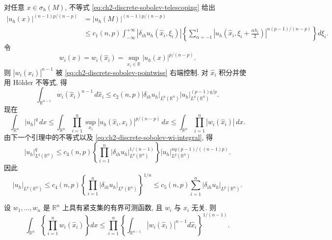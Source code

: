 \begin{Proof}
\hypertarget{chapter-02-page-138}{}
对任意 $x\in\sigma_h(M)$, 不等式 \eqref{eq:ch2-discrete-sobolev-telescoping} 给出
\begin{equation}
\begin{aligned}
|u_h(x)|^{(n-1)p/(n-p)}
&=|u_h(M)|^{(n-1)p/(n-p)}\\
&\leq c_1(n,p)\int_{-\infty}^{+\infty}
|\delta_{ih}u_h(\widehat x_i,\xi_i)|
\left\{\sum_{\alpha=-1}^{1}
\left|u_h\left(\widehat x_i,\xi_i+\frac{\alpha h_i}{2}\right)\right|^{n(p-1)/(n-p)}\right\}d\xi_i.
\end{aligned}
\label{eq:ch2-discrete-sobolev-pointwise}
\end{equation}
令
\begin{equation}
w_i(x)=w_i(\widehat x_i)=\sup_{x_i\in\mathbb R}|u_h(x)|^{p/(n-p)}.
\label{eq:ch2-discrete-sobolev-wi}
\end{equation}
则 $|w_i(\widehat x_i)|^{n-1}$ 被 \eqref{eq:ch2-discrete-sobolev-pointwise} 右端控制. 对 $\widehat x_i$ 积分并使用 Hölder 不等式, 得
\begin{equation}
\int_{\mathbb R^{n-1}}w_i(\widehat x_i)^{n-1}\,d\widehat x_i
\leq c_2(n,p)|\delta_{ih}u_h|_{L^p(\mathbb R^n)}
|u_h|_{L^q(\mathbb R^n)}^{(p-1)q/p}.
\label{eq:ch2-discrete-sobolev-wi-integral}
\end{equation}
现在
\[
\int_{\mathbb R^n}|u_h|^q\,dx
\leq\int_{\mathbb R^n}\prod_{i=1}^{n}\sup_{x_i}|u_h(\widehat x_i,x_i)|^{p/(n-p)}\,dx
\leq\int_{\mathbb R^n}\prod_{i=1}^{n}|w_i(\widehat x_i)|\,dx.
\]
由下一个引理中的不等式以及 \eqref{eq:ch2-discrete-sobolev-wi-integral}, 得
\[
|u_h|_{L^q(\mathbb R^n)}^q
\leq c_3(n,p)
\left\{\prod_{i=1}^{n}|\delta_{ih}u_h|_{L^p(\mathbb R^n)}^{1/(n-1)}\right\}
|u_h|_{L^q(\mathbb R^n)}^{nq(p-1)/((n-1)p)}.
\]
因此
\[
|u_h|_{L^q(\mathbb R^n)}
\leq c_4(n,p)
\left\{\prod_{i=1}^{n}|\delta_{ih}u_h|_{L^p(\mathbb R^n)}\right\}^{1/n}
\leq c_5(n,p)\sum_{i=1}^{n}|\delta_{ih}u_h|_{L^p(\mathbb R^n)}.
\]
\end{Proof}

\hypertarget{chapter-02-page-139}{}
\begin{Lemma}
\label{lem:ch2-gagliardo-product-inequality}
设 $w_1,\ldots,w_n$ 是 $\mathbb R^n$ 上具有紧支集的有界可测函数, 且 $w_i$ 与 $x_i$ 无关. 则
\begin{equation}
\int_{\mathbb R^n}\left\{\prod_{i=1}^{n}w_i(\widehat x_i)\right\}dx
\leq\prod_{i=1}^{n}
\left\{\int_{\mathbb R^{n-1}}|w_i(\widehat x_i)|^{n-1}d\widehat x_i\right\}^{1/(n-1)}.
\label{eq:ch2-gagliardo-product-inequality}
\end{equation}
\end{Lemma}

